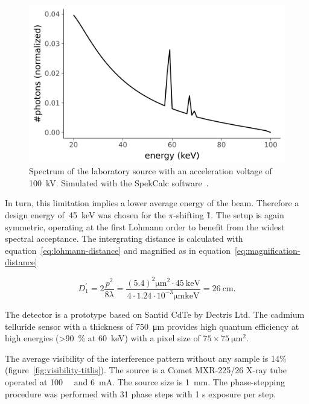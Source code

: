\begin{figure}[htb]
    \centering
    \includegraphics[width=\textwidth]{gfx/spectrum-visibility/spectrum-100kV.png}
    \caption{Spectrum of the laboratory source with an acceleration voltage of
        \SI{100}{\kilo\volt}. Simulated with the SpekCalc
        software~\cite{spekcalc}.}
    \label{fig:spectrum-100kV}
\end{figure}

In turn, this limitation implies a lower average energy of the beam.
Therefore a design energy of~\SI{45}{\kilo\eV} was chosen for the
$\pi$-shifting \G1. The setup is again symmetric, operating at the first
Lohmann order to benefit from the widest spectral acceptance. The
intergrating distance is calculated with
equation~\eqref{eq:lohmann-distance} and magnified as in
equation~\eqref{eq:magnification-distance}

\begin{equation}
    D_1^\prime = 2\frac{p^2}{8\lambda} =
    \frac{(5.4)^2\si{\micro\meter\squared} \cdot \SI{45}{\kilo\eV}}{4
        \cdot 1.24 \cdot 10^{-3}\si{\micro\meter\kilo\eV}} =
        \SI{26}{\centi\meter}.
    \label{eq:intergrating-distance}
\end{equation}

The detector is a prototype based on
Santid CdTe by Dectris Ltd. The cadmium telluride sensor with a thickness of \SI{750}{\micro\meter} provides
high quantum efficiency at high energies (>\SI{90}{\percent} at
\SI{60}{\kilo\eV}) with a pixel size
of $75\times\SI{75}{\micro\meter\squared}$. 

The average visibility of the interference pattern without any
sample is 14\% (figure~\ref{fig:visibility-titlis}). The source is a Comet
MXR-225/26 X-ray tube operated at \SI{100}{\kilo\voltpeak} and
\SI{6}{\milli\ampere}. The source size is \SI{1}{\milli\meter}.
The phase-stepping procedure was performed with 31 phase steps with 1 s
exposure per step.

